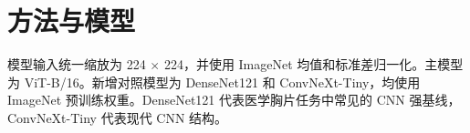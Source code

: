\chapter{方法与模型}

模型输入统一缩放为 224 $\times$ 224，并使用 ImageNet 均值和标准差归一化。主模型为 ViT-B/16。新增对照模型为 DenseNet121 和 ConvNeXt-Tiny，均使用 ImageNet 预训练权重。DenseNet121 代表医学胸片任务中常见的 CNN 强基线，ConvNeXt-Tiny 代表现代 CNN 结构。
